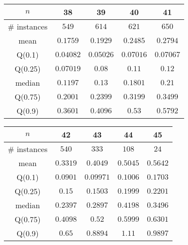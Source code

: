 \begin{tabular}{c|cccc} 
\hline 
$n$ & 38 & 39 & 40 & 41 \tabularnewline 
\hline 
\hline 
\# instances & $549$ & $614$ & $621$ & $650$ \tabularnewline 
mean & $0.1759$ & $0.1929$ & $0.2485$ & $0.2794$ \tabularnewline 
Q(0.1) & $0.04082$ & $0.05026$ & $0.07016$ & $0.07067$ \tabularnewline 
Q(0.25) & $0.07019$ & $0.08$ & $0.11$ & $0.12$ \tabularnewline 
median & $0.1197$ & $0.13$ & $0.1801$ & $0.21$ \tabularnewline 
Q(0.75) & $0.2001$ & $0.2399$ & $0.3199$ & $0.3499$ \tabularnewline 
Q(0.9) & $0.3601$ & $0.4096$ & $0.53$ & $0.5792$ \tabularnewline 
\hline 
\end{tabular} 
\medskip{} 

\begin{tabular}{c|cccc} 
\hline 
$n$ & 42 & 43 & 44 & 45 \tabularnewline 
\hline 
\hline 
\# instances & $540$ & $333$ & $108$ & $24$ \tabularnewline 
mean & $0.3319$ & $0.4049$ & $0.5045$ & $0.5642$ \tabularnewline 
Q(0.1) & $0.0901$ & $0.09971$ & $0.1006$ & $0.1703$ \tabularnewline 
Q(0.25) & $0.15$ & $0.1503$ & $0.1999$ & $0.2201$ \tabularnewline 
median & $0.2397$ & $0.2897$ & $0.4198$ & $0.3496$ \tabularnewline 
Q(0.75) & $0.4098$ & $0.52$ & $0.5999$ & $0.6301$ \tabularnewline 
Q(0.9) & $0.65$ & $0.8894$ & $1.11$ & $0.9897$ \tabularnewline 
\hline 
\end{tabular} 
\medskip{} 

